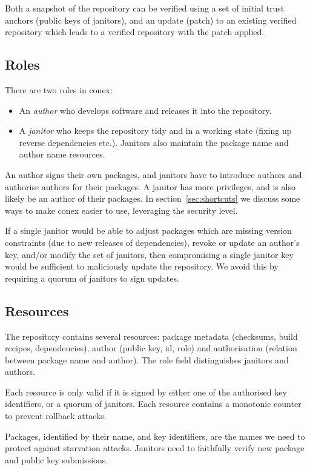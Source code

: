 \documentclass[nocopyrightspace]{sigplanconf}
\begin{document}
Both a snapshot of the repository can be verified using a set of initial trust anchors (public keys of janitors), and an update (patch) to an existing verified repository which leads to a verified repository with the patch applied.

\subsection{Roles}
There are two roles in conex:
\begin{itemize}
  \item An \emph{author} who develops software and releases it into the repository.
  \item A \emph{janitor} who keeps the repository tidy and in a working state (fixing up reverse dependencies etc.).  Janitors also maintain the package name and author name resources.
\end{itemize}

An author signs their own packages, and janitors have to introduce authors and authorise authors for their packages.
A janitor has more privileges, and is also likely be an author of their packages.
In section~\ref{sec:shortcuts} we discuss some ways to make conex easier to use, leveraging the security level.

If a single janitor would be able to adjust packages which are missing version constraints (due to new releases of dependencies), revoke or update an author's key, and/or modify the set of janitors, then compromising a single janitor key would be sufficient to maliciously update the repository.
We avoid this by requiring a quorum of janitors to sign updates.

\subsection{Resources}
The repository contains several resources: package metadata (checksums, build recipes, dependencies), author (public key, id, role) and authorisation (relation between package name and author).
The role field distinguishes janitors and authors.

Each resource is only valid if it is signed by either one of the authorised key identifiers, or a quorum of janitors.
Each resource contains a monotonic counter to prevent rollback attacks.

Packages, identified by their name, and key identifiers, are the names we need to protect against starvation attacks.
Janitors need to faithfully verify new package and public key submissions.
\end{document}

